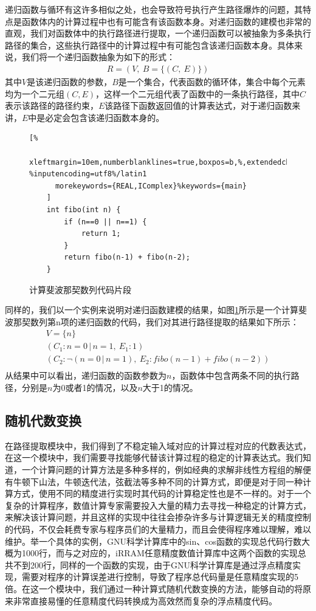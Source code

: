 递归函数与循环有这许多相似之处，也会导致符号执行产生路径爆炸的问题，其特点是函数体内的计算过程中也有可能含有该函数本身。对递归函数的建模也非常的直观，我们对函数体中的执行路径进行提取，一个递归函数可以被抽象为多条执行路径的集合，这些执行路径中的计算过程中有可能包含该递归函数本身。具体来说，我们将一个递归函数抽象为如下的形式：
\begin{gather*}
    R = (V,\ B = \{(C,\ E)\})
\end{gather*}
其中$V$是该递归函数的参数，$B$是一个集合，代表函数的循环体，集合中每个元素均为一个二元组$(C, E)$，这样一个二元组代表了函数中的一条执行路径，其中$C$表示该路径的路径约束，$E$该路径下函数返回值的计算表达式，对于递归函数来讲，$E$中是必定会包含该递归函数本身的。

\begin{figure}[htbp]
  \centering
  \begin{lstlisting}[%
      xleftmargin=10em,numberblanklines=true,boxpos=b,%,extendedchars=\true, %inputencoding=utf8%/latin1
      morekeywords={REAL,IComplex}%keywords={main}
    ]
    int fibo(int n) {
        if (n==0 || n==1) {
            return 1;
        }
        return fibo(n-1) + fibo(n-2);
    }
  \end{lstlisting}
  \caption{计算斐波那契数列代码片段}\label{lst:fibocode}
\end{figure}

同样的，我们以一个实例来说明对递归函数建模的结果，如图\ref{lst:fibocode}所示是一个计算斐波那契数列第n项的递归函数的代码，我们对其进行路径提取的结果如下所示：
\begin{gather*}
  V = \{n\}\\
  (C_1: n=0\,|\,n=1,\ E_1: 1) \\
  (C_2: \neg (n=0\,|\,n=1),\ E_2: fibo(n-1)+fibo(n-2))\\
\end{gather*}
从结果中可以看出，递归函数的函数参数为$n$，函数体中包含两条不同的执行路径，分别是$n$为0或者1的情况，以及$n$大于1的情况。

\subsection{随机代数变换}

在路径提取模块中，我们得到了不稳定输入域对应的计算过程对应的代数表达式，在这一个模块中，我们需要寻找能够代替该计算过程的稳定的计算表达式。我们知道，一个计算问题的计算方法是多种多样的，例如经典的求解非线性方程组的解便有牛顿下山法，牛顿迭代法，弦截法等多种不同的计算方式，即便是对于同一种计算方式，使用不同的精度进行实现时其代码的计算稳定性也是不一样的。对于一个复杂的计算程序，数值计算专家需要投入大量的精力去寻找一种稳定的计算方式，来解决该计算问题，并且这样的实现中往往会掺杂许多与计算逻辑无关的精度控制的代码，不仅会耗费专家与程序员们的大量精力，而且会使得程序难以理解，难以维护。举一个具体的实例，GNU科学计算库中的sin、cos函数的实现总代码行数大概为1000行，而与之对应的，iRRAM任意精度数值计算库中这两个函数的实现总共不到200行，同样的一个函数的实现，由于GNU科学计算库是通过浮点精度实现，需要对程序的计算误差进行控制，导致了程序总代码量是任意精度实现的5倍。在这一个模块中，我们通过一种计算式随机代数变换的方法，能够自动的将原来非常直接易懂的任意精度代码转换成为高效然而复杂的浮点精度代码。
